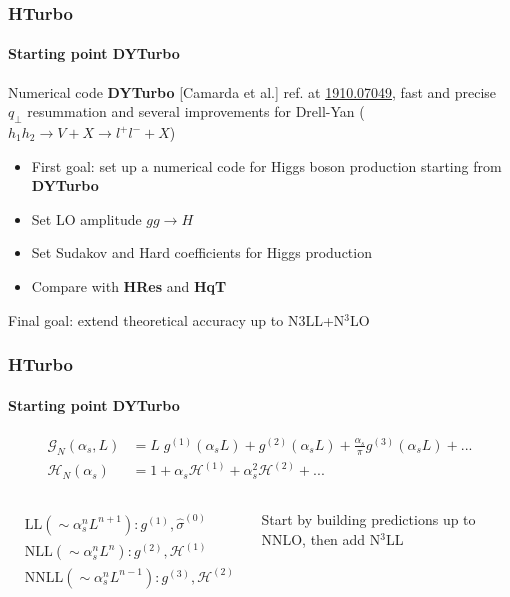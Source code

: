 \documentclass[aspectratio=43]{beamer}
\begin{document}
\begin{frame}

	\frametitle{HTurbo}
	\framesubtitle{Starting point DYTurbo}

	Numerical code \textbf{DYTurbo} {\color{blue}[Camarda et al.]} ref. at {\color{blue} \href{https://arxiv.org/abs/1910.07049}{1910.07049}}, fast and precise $q_{\perp}$ resummation and several improvements for Drell-Yan ($h_{1}h_{2} \rightarrow V + X \rightarrow l^{+}l^{-} + X$) 
	
	\begin{itemize}
		\item {\color{red}First goal}: set up a numerical code for Higgs boson production starting from  \textbf{DYTurbo}
		\item Set LO amplitude $gg \rightarrow H$
		\item Set Sudakov and Hard coefficients for Higgs production
		\item Compare with \textbf{HRes} and \textbf{HqT}
	\end{itemize}

	\vspace{0.5 cm}

	{\color{red}Final goal}: extend theoretical accuracy up to N$3$LL+N$^{3}$LO

\end{frame}

\begin{frame}

	\frametitle{HTurbo}
	\framesubtitle{Starting point DYTurbo}

	\begin{align}
		\mathcal{G}_{N}(\alpha_{s}, L) &= L\;g^{(1)}(\alpha_{s}L) + g^{(2)}(\alpha_{s}L) + \frac{\alpha_{s}}{\pi}g^{(3)}(\alpha_{s}L) + ... \nonumber \\
		\mathcal{H}_{N}(\alpha_{s}) &= 1 + \alpha_{s}\mathcal{H}^{(1)} + \alpha_{s}^{2}\mathcal{H}^{(2)} + ...  \nonumber
	\end{align}
	
	\begin{columns}
		

		\begin{align}
			&\textrm{LL} (\sim \alpha_{s}^{n}L^{n+1}): g^{(1)}, \hat{\sigma}^{(0)} \nonumber \\
			&\textrm{NLL} (\sim \alpha_{s}^{n}L^{n}): g^{(2)}, \mathcal{H}^{(1)} \nonumber \\
			&\textrm{NNLL} (\sim \alpha_{s}^{n}L^{n-1}): g^{(3)}, \mathcal{H}^{(2)} \nonumber
		\end{align}
	
		
		Start by building predictions up to NNLO, then add {\color{blue}N$^{3}$LL}
		
	\end{columns}

\end{frame}
\end{document}
